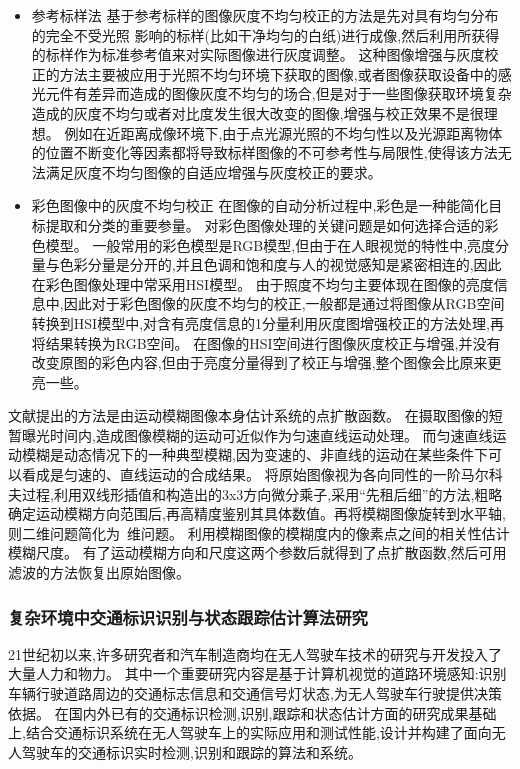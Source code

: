 \documentclass{amsart}
\begin{document}
\begin{itemize}
\item 参考标样法
基于参考标样的图像灰度不均匀校正的方法是先对具有均匀分布的完全不受光照
影响的标样(比如干净均匀的白纸)进行成像,然后利用所获得的标样作为标准参考值来对实际图像进行灰度调整。
这种图像增强与灰度校正的方法主要被应用于光照不均匀环境下获取的图像,或者图像获取设备中的感光元件有差异而造成的图像灰度不均匀的场合,但是对于一些图像获取环境复杂造成的灰度不均匀或者对比度发生很大改变的图像,增强与校正效果不是很理想。
例如在近距离成像环境下,由于点光源光照的不均匀性以及光源距离物体的位置不断变化等因素都将导致标样图像的不可参考性与局限性,使得该方法无法满足灰度不均匀图像的自适应增强与灰度校正的要求。
\item 彩色图像中的灰度不均匀校正
  在图像的自动分析过程中,彩色是一种能简化目标提取和分类的重要参量。
  对彩色图像处理的关键问题是如何选择合适的彩色模型。
  一般常用的彩色模型是RGB模型,但由于在人眼视觉的特性中,亮度分量与色彩分量是分开的,并且色调和饱和度与人的视觉感知是紧密相连的,因此在彩色图像处理中常采用HSI模型。
  由于照度不均匀主要体现在图像的亮度信息中,因此对于彩色图像的灰度不均匀的校正,一般都是通过将图像从RGB空间转换到HSI模型中,对含有亮度信息的1分量利用灰度图增强校正的方法处理,再将结果转换为RGB空间。
  在图像的HSI空间进行图像灰度校正与增强,并没有改变原图的彩色内容,但由于亮度分量得到了校正与增强,整个图像会比原来更亮一些。
\end{itemize}


文献\cite{马明}提出的方法是由运动模糊图像本身估计系统的点扩散函数。
在摄取图像的短暂曝光时间内,造成图像模糊的运动可近似作为匀速直线运动处理。
而匀速直线运动模糊是动态情况下的一种典型模糊,因为变速的、非直线的运动在某些条件下可以看成是匀速的、直线运动的合成结果。
将原始图像视为各向同性的一阶马尔科夫过程,利用双线形插值和构造出的3x3方向微分乘子,采用“先租后细”的方法,粗略确定运动模糊方向范围后,再高精度鉴别其具体数值。再将模糊图像旋转到水平轴,则二维问题简化为~维问题。
利用模糊图像的模糊度内的像素点之间的相关性估计模糊尺度。
有了运动模糊方向和尺度这两个参数后就得到了点扩散函数,然后可用滤波的方法恢复出原始图像。


\subsubsection{复杂环境中交通标识识别与状态跟踪估计算法研究}
21世纪初以来,许多研究者和汽车制造商均在无人驾驶车技术的研究与开发投入了大量人力和物力。
其中一个重要研究内容是基于计算机视觉的道路环境感知:识别车辆行驶道路周边的交通标志信息和交通信号灯状态,为无人驾驶车行驶提供决策依据。
在国内外已有的交通标识检测,识别,跟踪和状态估计方面的研究成果基础上,结合交通标识系统在无人驾驶车上的实际应用和测试性能,设计并构建了面向无人驾驶车的交通标识实时检测,识别和跟踪的算法和系统。
\end{document}
